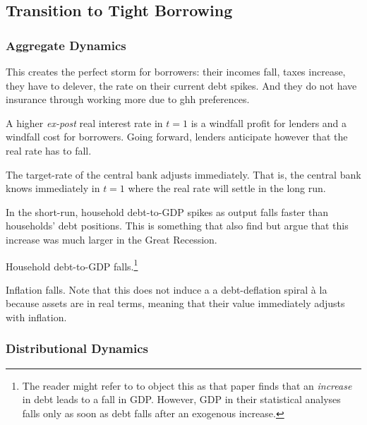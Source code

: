 \documentclass[12pt]{article} %
\numberwithin{equation}{section} %
\begin{document}
\subsection{Transition to Tight Borrowing}
\label{sec:limit-transition}

\subsubsection*{Aggregate Dynamics}

This creates the perfect storm for borrowers: their incomes fall, taxes increase, they have to delever, the rate on their current debt spikes. And they do not have insurance through working more due to \Gls{ghh} preferences.

A higher \textit{ex-post} real interest rate in $t=1$ is a windfall profit for lenders and a windfall cost for borrowers. Going forward, lenders anticipate however that the real rate has to fall.

The target-rate of the central bank adjusts immediately. That is, the central bank knows immediately in $t=1$ where the real rate will settle in the long run.

In the short-run, household debt-to-GDP spikes as output falls faster than households' debt positions. This is something that \textcite{justiniano2015} also find but argue that this increase was much larger in the Great Recession. 

Household debt-to-GDP falls.\footnote{The reader might refer to \textcite{mian2017} to object this as that paper finds that an \textit{increase} in debt leads to a fall in GDP. However, GDP in their statistical analyses falls only as soon as debt falls after an exogenous increase.}

Inflation falls. Note that this does not induce a a debt-deflation spiral à la \textcite{fisher1933} because assets are in real terms, meaning that their value immediately adjusts with inflation.

\subsubsection*{Distributional Dynamics}
\end{document}
